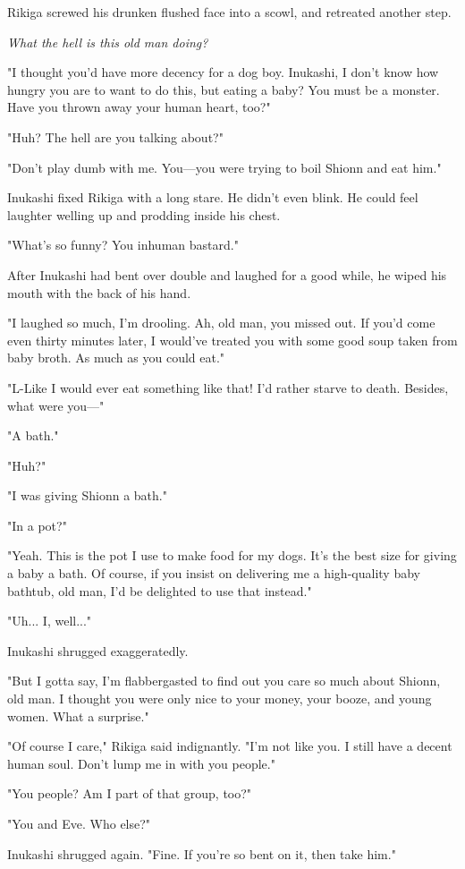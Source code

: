 Rikiga screwed his drunken flushed face into a scowl, and retreated
another step.

\emph{What the hell is this old man doing?}

"I thought you'd have more decency for a dog boy. Inukashi, I don't know
how hungry you are to want to do this, but eating a baby? You must be a
monster. Have you thrown away your human heart, too?"

"Huh? The hell are you talking about?"

"Don't play dumb with me. You---you were trying to boil Shionn and eat
him."

Inukashi fixed Rikiga with a long stare. He didn't even blink. He could
feel laughter welling up and prodding inside his chest.

"What's so funny? You inhuman bastard."

After Inukashi had bent over double and laughed for a good while, he
wiped his mouth with the back of his hand.

"I laughed so much, I'm drooling. Ah, old man, you missed out. If you'd
come even thirty minutes later, I would've treated you with some good
soup taken from baby broth. As much as you could eat."

"L-Like I would ever eat something like that! I'd rather starve to
death. Besides, what were you---"

"A bath."

"Huh?"

"I was giving Shionn a bath."

"In a pot?"

"Yeah. This is the pot I use to make food for my dogs. It's the best
size for giving a baby a bath. Of course, if you insist on delivering me
a high-quality baby bathtub, old man, I'd be delighted to use that
instead."

"Uh... I, well..."

Inukashi shrugged exaggeratedly.

"But I gotta say, I'm flabbergasted to find out you care so much about
Shionn, old man. I thought you were only nice to your money, your booze,
and young women. What a surprise."

"Of course I care," Rikiga said indignantly. "I'm not like you. I still
have a decent human soul. Don't lump me in with you people."

"You people? Am I part of that group, too?"

"You and Eve. Who else?"

Inukashi shrugged again. "Fine. If you're so bent on it, then take him."

